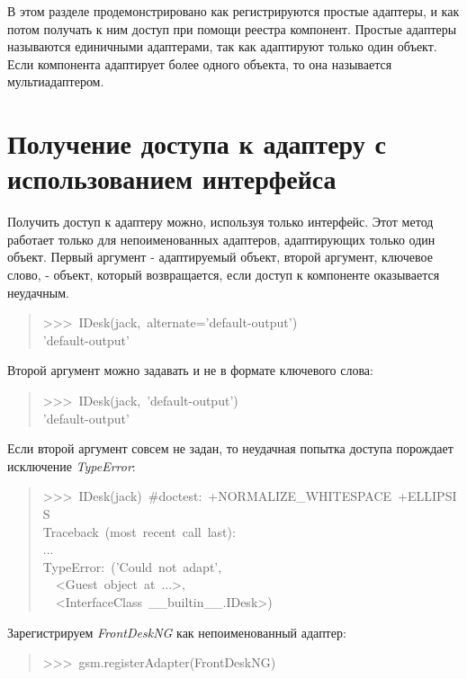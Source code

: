 \documentclass[a4paper,openany,twoside,final]{book}
\providecommand*{\DUroletitlereference}[1]{\textsl{#1}}
\begin{document}
В этом разделе продемонстрировано как регистрируются простые адаптеры,
и как потом получать к ним доступ при помощи реестра компонент.
Простые адаптеры называются единичными адаптерами, так как адаптируют
только один объект.  Если компонента адаптирует более одного объекта,
то она называется мультиадаптером.


\section{Получение доступа к адаптеру с использованием интерфейса%
  \label{id37}%
}

Получить доступ к адаптеру можно, используя только интерфейс.  Этот
метод работает только для непоименованных адаптеров, адаптирующих
только один объект.  Первый аргумент - адаптируемый объект, второй
аргумент, ключевое слово, - объект, который возвращается, если доступ
к компоненте оказывается неудачным.

\begin{quote}{\ttfamily \raggedright \noindent
>{}>{}>~IDesk(jack,~alternate='default-output')\\
'default-output'
}
\end{quote}

Второй аргумент можно задавать и не в формате ключевого слова:

\begin{quote}{\ttfamily \raggedright \noindent
>{}>{}>~IDesk(jack,~'default-output')\\
'default-output'
}
\end{quote}

Если второй аргумент совсем не задан, то неудачная попытка доступа
порождает исключение \DUroletitlereference{TypeError}:

\begin{quote}{\ttfamily \raggedright \noindent
>{}>{}>~IDesk(jack)~\#doctest:~+NORMALIZE\_WHITESPACE~+ELLIPSIS\\
Traceback~(most~recent~call~last):\\
...\\
TypeError:~('Could~not~adapt',\\
~~<Guest~object~at~...>,\\
~~<InterfaceClass~\_\_builtin\_\_.IDesk>)
}
\end{quote}

Зарегистрируем \DUroletitlereference{FrontDeskNG} как непоименованный адаптер:

\begin{quote}{\ttfamily \raggedright \noindent
>{}>{}>~gsm.registerAdapter(FrontDeskNG)
}
\end{quote}
\end{document}
